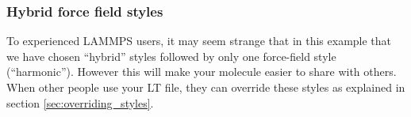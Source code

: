 \documentclass[11pt]{article}
\begin{document}
\subsubsection*{Hybrid force field styles}
To experienced LAMMPS users, it may seem strange 
that in this example that we have chosen ``hybrid'' 
styles followed by only one force-field style (``harmonic'').
However this will make your molecule easier to share with others. 
When other people use your LT file, they can override these
styles as explained in section \ref{sec:overriding_styles}.

\end{document}
